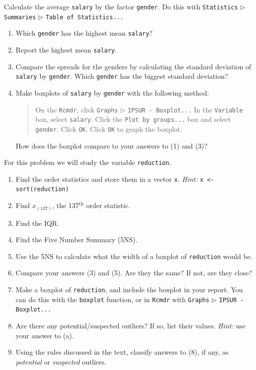 \documentclass[captions=tableheading]{scrbook}
\begin{document}
\begin{xca}
Calculate the average \texttt{salary} by the factor \texttt{gender}. Do this with \texttt{Statistics} \(\triangleright\) \texttt{Summaries} \(\triangleright\) \texttt{Table of Statistics...} 
\begin{enumerate}
\item Which \texttt{gender} has the highest mean \texttt{salary}?
\item Report the highest mean \texttt{salary}.
\item Compare the spreads for the genders by calculating the standard deviation of \texttt{salary} by \texttt{gender}. Which \texttt{gender} has the biggest standard deviation?
\item Make boxplots of \texttt{salary} by \texttt{gender} with the following method:
\begin{quote}
On the \texttt{Rcmdr}, click \texttt{Graphs} \(\triangleright\) \texttt{IPSUR - Boxplot...}
In the \texttt{Variable} box, select \texttt{salary}.
Click the \texttt{Plot by groups...} box and select \texttt{gender}. Click \texttt{OK}.
Click \texttt{OK} to graph the boxplot.
\end{quote}

   How does the boxplot compare to your answers to (1) and (3)?
\end{enumerate}
\end{xca}

\begin{xca}
For this problem we will study the variable \texttt{reduction}.
\begin{enumerate}
\item Find the order statistics and store them in a vector \texttt{x}. \emph{Hint:} \texttt{x <- sort(reduction)}
\item Find \(x_{(137)}\), the 137\(^{\mathrm{th}}\) order statistic.
\item Find the IQR.
\item Find the Five Number Summary (5NS).
\item Use the 5NS to calculate what the width of a boxplot of \texttt{reduction} would be.
\item Compare your answers (3) and (5). Are they the same? If not, are they close?
\item Make a boxplot of \texttt{reduction}, and include the boxplot in your report. You can do this with the \texttt{boxplot} function, or in \texttt{Rcmdr} with \texttt{Graphs} \(\triangleright\) \texttt{IPSUR - Boxplot...}
\item Are there any potential/suspected outliers? If so, list their values. \emph{Hint:} use your answer to (a).
\item Using the rules discussed in the text, classify answers to (8), if any, as \emph{potential} or \emph{suspected} outliers.
\end{enumerate}

\end{xca}
\end{document}
